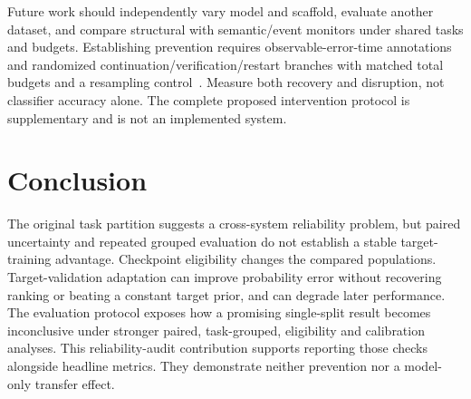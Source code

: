 \documentclass[conference]{IEEEtran}
\begin{document}
Future work should independently vary model and scaffold, evaluate another dataset, and compare structural with semantic/event monitors under shared tasks and budgets. Establishing prevention requires observable-error-time annotations and randomized continuation/verification/restart branches with matched total budgets and a resampling control~\cite{sentinel,dover}. Measure both recovery and disruption, not classifier accuracy alone. The complete proposed intervention protocol is supplementary and is not an implemented system.

\section{Conclusion}
The original task partition suggests a cross-system reliability problem, but paired uncertainty and repeated grouped evaluation do not establish a stable target-training advantage. Checkpoint eligibility changes the compared populations. Target-validation adaptation can improve probability error without recovering ranking or beating a constant target prior, and can degrade later performance. The evaluation protocol exposes how a promising single-split result becomes inconclusive under stronger paired, task-grouped, eligibility and calibration analyses. This reliability-audit contribution supports reporting those checks alongside headline metrics. They demonstrate neither prevention nor a model-only transfer effect.
\end{document}
